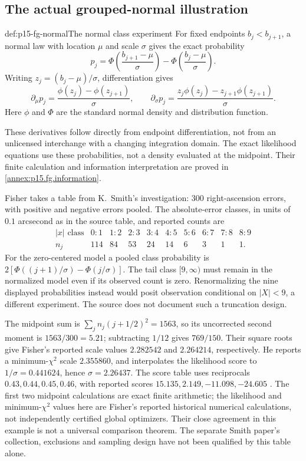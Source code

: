 \subsection{The actual grouped-normal illustration}

\begin{hbdefinition}{def:p15-fg-normal}{The normal class experiment}
For fixed endpoints \(b_j<b_{j+1}\), a normal law with location \(\mu\)
and scale \(\sigma\) gives the exact probability
\[
 p_j=\Phi\left(\frac{b_{j+1}-\mu}{\sigma}\right)
     -\Phi\left(\frac{b_j-\mu}{\sigma}\right).
\]
Writing \(z_j=(b_j-\mu)/\sigma\), differentiation gives
\[
 \partial_\mu p_j=\frac{\phi(z_j)-\phi(z_{j+1})}{\sigma},\qquad
 \partial_\sigma p_j=
 \frac{z_j\phi(z_j)-z_{j+1}\phi(z_{j+1})}{\sigma}.
\]
Here \(\phi\) and \(\Phi\) are the standard normal density and
distribution function.
\end{hbdefinition}
These derivatives follow directly from endpoint
differentiation, not from an unlicensed interchange with a changing
integration domain. The exact likelihood equations use these probabilities,
not a density evaluated at the midpoint. Their finite calculation and
information interpretation are proved in \cref{annex:p15.fg.information}.

Fisher takes a table from K.~Smith's investigation: 300 right-ascension
errors, with positive and negative errors pooled. The absolute-error
classes, in units of \(0.1\) arcsecond as in the source table, and
reported counts are
\[
\begin{array}{c|rrrrrrrrr}
 |x|\text{ class}&0\!:\!1&1\!:\!2&2\!:\!3&3\!:\!4&4\!:\!5&5\!:\!6&6\!:\!7&7\!:\!8&8\!:\!9\\
 n_j&114&84&53&24&14&6&3&1&1.
\end{array}
\]
For the zero-centered model a pooled class probability is
\(2[\Phi((j+1)/\sigma)-\Phi(j/\sigma)]\). The tail class
\([9,\infty)\) must remain in the normalized model even if its observed
count is zero. Renormalizing the nine displayed probabilities instead
would posit observation conditional on \(|X|<9\), a different experiment.
The source does not document such a truncation design.

The midpoint sum is \(\sum_jn_j(j+1/2)^2=1563\), so its uncorrected
second moment is \(1563/300=5.21\); subtracting \(1/12\) gives
\(769/150\). Their square roots give Fisher's reported scale values
\(2.282542\) and \(2.264214\), respectively. He reports a
minimum-\(\chi^2\) scale \(2.355860\), and interpolates the likelihood
score to \(1/\widehat\sigma=0.441624\), hence
\(\widehat\sigma=2.26437\). The score table uses reciprocals
\(0.43,0.44,0.45,0.46\), with reported scores
\(15.135,2.149,-11.098,-24.605\)
\cite[pp.~360--361]{Fisher1922Foundations}.
The first two midpoint calculations are exact finite arithmetic; the
likelihood and minimum-\(\chi^2\) values here are Fisher's reported
historical numerical calculations, not independently certified global
optimizers. Their close agreement in this example is not a universal
comparison theorem. The separate Smith paper's collection, exclusions
and sampling design have not been qualified by this table alone.

